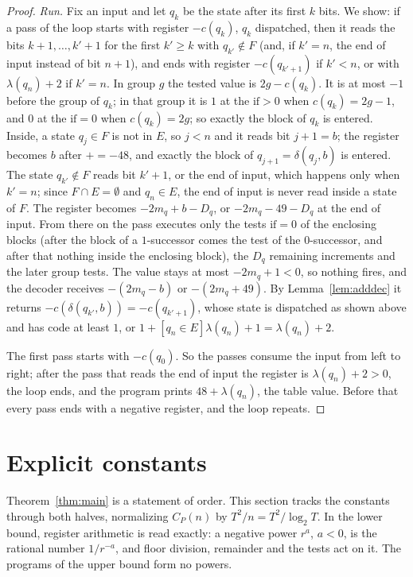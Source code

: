 \documentclass[11pt]{article}
\theoremstyle{remark}
\begin{document}
\begin{proof}
\emph{Run.}  Fix an input and let $q_k$ be the state after its first $k$ bits.  We
show: if a pass of the loop starts with register $-c(q_k)$, $q_k$ dispatched, then it
reads the bits $k+1,\dots,k'+1$ for the first $k'\ge k$ with $q_{k'}\notin F$ (and, if
$k'=n$, the end of input instead of bit $n+1$), and ends with register
$-c(q_{k'+1})$ if $k'<n$, or with $\lambda(q_n)+2$ if $k'=n$.  In group $g$ the
tested value is $2g-c(q_k)$.  It is at most $-1$ before the group of $q_k$; in that
group it is $1$ at the $\text{if}>0$ when $c(q_k)=2g-1$, and $0$ at the $\text{if}=0$
when $c(q_k)=2g$; so exactly the block of $q_k$ is entered.  Inside, a state
$q_j\in F$ is not in $E$, so $j<n$ and it reads bit $j+1=b$; the register becomes
$b$ after $\mathord{+}\!=-48$, and exactly the block of $q_{j+1}=\delta(q_j,b)$ is
entered.  The state $q_{k'}\notin F$ reads bit $k'+1$, or the end of input, which
happens only when $k'=n$; since $F\cap E=\emptyset$ and $q_n\in E$, the end of input
is never read inside a state of $F$.  The register becomes $-2m_q+b-D_q$, or
$-2m_q-49-D_q$ at the end of input.  From there on the pass executes only
the tests $\text{if}=0$ of the enclosing blocks (after the block of a
$1$-successor comes the test of the $0$-successor, and after that nothing inside
the enclosing block), the $D_q$ remaining increments and the later
group tests.  The value stays at most $-2m_q+1<0$, so nothing fires, and the decoder
receives $-(2m_q-b)$ or $-(2m_q+49)$.  By Lemma~\ref{lem:adddec} it returns
$-c(\delta(q_{k'},b))=-c(q_{k'+1})$, whose state is dispatched as shown above and
has code at least $1$, or $1+[q_n\in E]\lambda(q_n)+1=\lambda(q_n)+2$.

The first pass starts with $-c(q_0)$.  So the passes consume the input from left to
right; after the pass that reads the end of input the register is
$\lambda(q_n)+2>0$, the loop ends, and the program prints $48+\lambda(q_n)$, the
table value.  Before that every pass ends with a negative register, and the loop
repeats.
\end{proof}


\section{Explicit constants}\label{sec:constants}

Theorem~\ref{thm:main} is a statement of order.  This section tracks the
constants through both halves, normalizing $C_P(n)$ by $T^2/n=T^2/\log_2T$.  In the
lower bound, register arithmetic is read exactly: a negative power $r^a$, $a<0$, is the
rational number $1/r^{-a}$, and floor division, remainder and the tests act on it.  The
programs of the upper bound form no powers.
\end{document}
